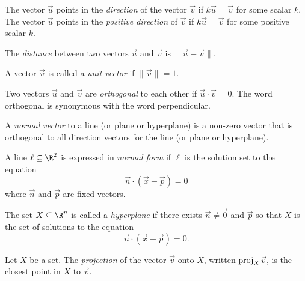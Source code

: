 \begin{SaveDefinition}[key=Direction, title={Direction}]
	The vector $\vec u$ points in the \emph{direction} of
	the vector $\vec v$ if $k\vec u=\vec v$ for some scalar $k$.
	The vector $\vec u$ points in the \emph{positive direction} of
	$\vec v$ if $k\vec u=\vec v$ for some positive scalar $k$.
\end{SaveDefinition}

\begin{SaveDefinition}[key=Distance, title={Distance}]
	The
	\emph{distance} between two vectors $\vec u$ and $\vec v$ is
	$\|\vec u-\vec v\|$.
\end{SaveDefinition}

\begin{SaveDefinition}[key=UnitVector, title={Unit Vector}]
	A vector $\vec v$ is called a
	\emph{unit vector} if $\|\vec v\|=1$.
\end{SaveDefinition}

\begin{SaveDefinition}[key=Orthogonal, title={Orthogonal}]
	Two vectors $\vec u$ and $\vec v$ are
	\emph{orthogonal} to each other if $\vec u\cdot \vec v=0$. The word orthogonal
	is synonymous with the word perpendicular.
\end{SaveDefinition}

\begin{SaveDefinition}[key=NormalVector, title={Normal Vector}]
	A
	\emph{normal vector} to a line (or plane or hyperplane) is a non-zero
	vector that is orthogonal to all direction vectors for the line (or plane
	or hyperplane).
\end{SaveDefinition}

\begin{SaveDefinition}[key=NormalFormofaLine, title={Normal Form of a Line}]
	A line $\ell\subseteq \R^2$ is expressed in \emph{normal form} if $\ell$
	is the solution set to the equation
	\[
		\vec n\cdot (\vec x-\vec p)=0
	\]
	where $\vec n$ and $\vec p$ are fixed vectors.
\end{SaveDefinition}

\begin{SaveDefinition}[key=Hyperplane, title={Hyperplane}]
	The set $X\subseteq \R^n$ is called a \emph{hyperplane} if there
	exists $\vec n\neq \vec 0$ and $\vec p$ so that $X$ is the set of solutions
	to the equation
	\[
		\vec n\cdot (\vec x-\vec p)=0.
	\]
\end{SaveDefinition}


\begin{SaveDefinition}[key=Projection, title={Projection}]
	Let $X$ be a set. The
	\emph{projection} of the vector $\vec v$ onto $X$, written $\operatorname{proj}_{X}\vec
	v$, is the closest point in $X$ to $\vec v$.
\end{SaveDefinition}

